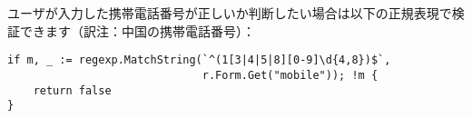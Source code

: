 ユーザが入力した携帯電話番号が正しいか判断したい場合は以下の正規表現で検証できます（訳注：中国の携帯電話番号）：

\begin{lstlisting}[numbers=none]
if m, _ := regexp.MatchString(`^(1[3|4|5|8][0-9]\d{4,8})$`,
                              r.Form.Get("mobile")); !m {
    return false
}
\end{lstlisting}
